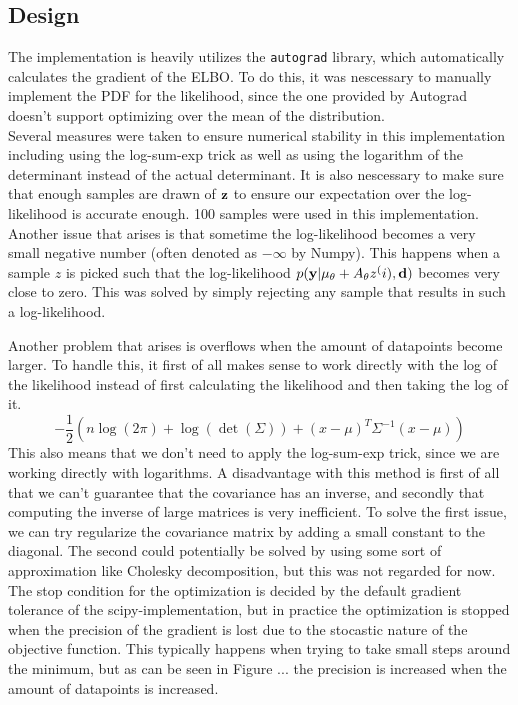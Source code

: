 \subsection{Design}
The implementation is heavily utilizes the \texttt{autograd} library, which automatically calculates the gradient of the ELBO.
To do this, it was nescessary to manually implement the PDF for the likelihood, since the one provided by Autograd doesn't support optimizing over the mean of the distribution.\\
Several measures were taken to ensure numerical stability in this implementation including using the log-sum-exp trick as well as using the logarithm of the determinant instead of the actual determinant.
It is also nescessary to make sure that enough samples are drawn of $\mathbf{z}$ to ensure our expectation over the log-likelihood is accurate enough. 100 samples were used in this implementation.
Another issue that arises is that sometime the log-likelihood becomes a very small negative number (often denoted as $-\infty$ by Numpy). This happens when a sample $z$ is picked such that the log-likelihood $p(\mathbf{y}| \mu_\theta + A_\theta z^(i), \mathbf{d})$ becomes very close to zero.
This was solved by simply rejecting any sample that results in such a log-likelihood.

Another problem that arises is overflows when the amount of datapoints become larger.
To handle this, it first of all makes sense to work directly with the log of the likelihood instead of first calculating the likelihood and then taking the log of it.
$$-\frac{1}{2}(n \log(2\pi) + \log(\det(\Sigma)) + (x-\mu)^T \Sigma^{-1}(x-\mu))$$ 
This also means that we don't need to apply the log-sum-exp trick, since we are working directly with logarithms.
A disadvantage with this method is first of all that we can't guarantee that the covariance has an inverse, and secondly that computing the inverse of large matrices is very inefficient.
To solve the first issue, we can try regularize the covariance matrix by adding a small constant to the diagonal.
The second could potentially be solved by using some sort of approximation like Cholesky decomposition, but this was not regarded for now.
The stop condition for the optimization is decided by the default gradient tolerance of the scipy-implementation, 
but in practice the optimization is stopped when the precision of the gradient is lost due to the stocastic nature of the objective function.
This typically happens when trying to take small steps around the minimum, but as can be seen in Figure ... the precision is increased when the amount of datapoints is increased.
